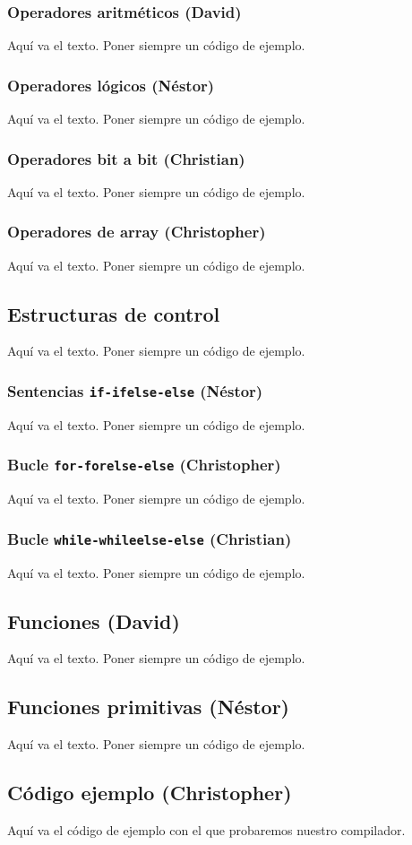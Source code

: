 \documentclass[11pt, english]{article}
\begin{document}
\subsubsection{Operadores aritméticos (David)}
Aquí va el texto. Poner siempre un código de ejemplo.

\subsubsection{Operadores lógicos (Néstor)}
Aquí va el texto. Poner siempre un código de ejemplo.

\subsubsection{Operadores bit a bit (Christian)}
Aquí va el texto. Poner siempre un código de ejemplo.

\subsubsection{Operadores de array (Christopher)}
Aquí va el texto. Poner siempre un código de ejemplo.
\newpage

\subsection{Estructuras de control}
Aquí va el texto. Poner siempre un código de ejemplo.

\subsubsection{Sentencias \texttt{if-ifelse-else} (Néstor)}
Aquí va el texto. Poner siempre un código de ejemplo.

\subsubsection{Bucle \texttt{for-forelse-else} (Christopher)}
Aquí va el texto. Poner siempre un código de ejemplo.

\subsubsection{Bucle \texttt{while-whileelse-else} (Christian)}
Aquí va el texto. Poner siempre un código de ejemplo.
\newpage

\subsection{Funciones (David)}
Aquí va el texto. Poner siempre un código de ejemplo.
\newpage

\subsection{Funciones primitivas (Néstor)}
Aquí va el texto. Poner siempre un código de ejemplo.
\newpage

\subsection{Código ejemplo (Christopher)}
Aquí va el código de ejemplo con el que probaremos nuestro compilador.
\end{document}

